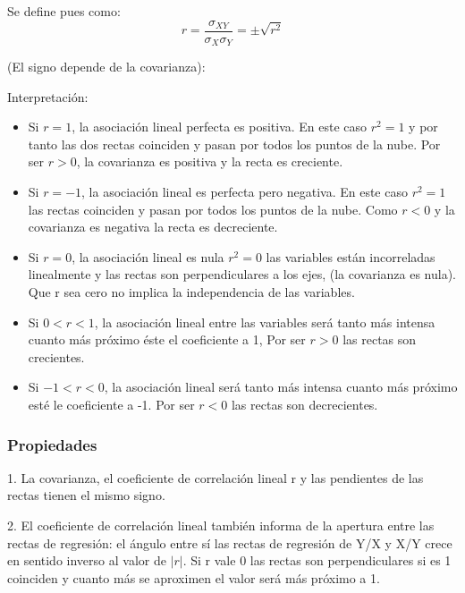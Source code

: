 \documentclass{article}
\theoremstyle{definition}
\begin{document}
Se define pues como:
$$ r = \frac{\sigma_{XY}}{\sigma_{X} \sigma_{Y}}  = \pm \sqrt{r^2}$$

(El signo depende de la covarianza):

Interpretación:

\begin{itemize}

\item Si $r = 1$, la asociación lineal perfecta es positiva. En este caso $r^2 = 1$ y
por tanto las dos rectas coinciden y pasan por todos los puntos de la nube. Por
ser $r > 0$, la covarianza es positiva y la recta es creciente.

\item Si $r= -1$, la asociación lineal es perfecta pero negativa. En este caso $r^2 =
1$ las rectas coinciden y pasan por todos los puntos de la nube. Como $r < 0$ y
la covarianza es negativa la recta es decreciente.

\item Si $r = 0$, la asociación lineal es nula $r^2 = 0$ las variables están
incorreladas linealmente y las rectas son perpendiculares a los ejes, (la
covarianza es nula).  Que r sea cero no implica la independencia de las
variables.

\item Si $ 0 < r < 1 $, la asociación lineal entre las variables será tanto más intensa
cuanto más próximo éste el coeficiente a 1, Por ser $ r > 0 $ las rectas son
crecientes.

\item Si $ -1 < r < 0 $, la asociación lineal será tanto más intensa cuanto más próximo
esté le coeficiente a -1. Por ser $ r < 0$ las rectas son decrecientes.

\end{itemize}

\subsubsection{Propiedades}

1. La covarianza, el coeficiente de correlación lineal r y las pendientes de las
rectas tienen el mismo signo.

2. El coeficiente de correlación lineal también informa de la apertura entre las
rectas de regresión: el ángulo entre sí las rectas de regresión de Y/X y X/Y
crece en sentido inverso al valor de $ |r| $. Si r vale 0 las rectas son
perpendiculares si es 1 coinciden y cuanto más se aproximen el valor será más
próximo a 1.
\end{document}
